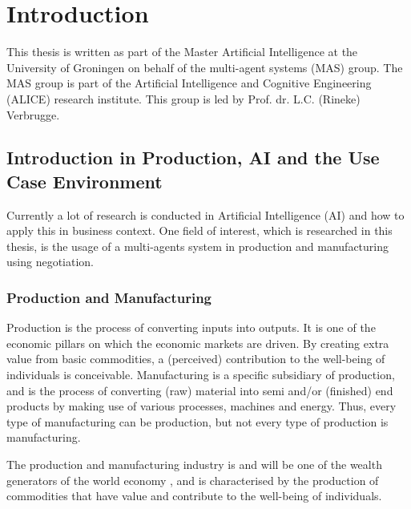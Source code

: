 \chapter{Introduction}
\label{ch:intro}
This thesis is written as part of the Master Artificial Intelligence at the University of Groningen on behalf of the multi-agent systems (MAS) group. The MAS group is part of the Artificial Intelligence and Cognitive Engineering (ALICE) research institute. This group is led by Prof. dr. L.C. (Rineke) Verbrugge.  
   
\section{Introduction in Production, AI and the Use Case Environment}

Currently a lot of research is conducted in Artificial Intelligence (AI) and how to apply this in business context. One field of interest, which is researched in this thesis, is the usage of a multi-agents system in production and manufacturing using negotiation.

\subsection{Production and Manufacturing}
Production is the process of converting inputs into outputs. It is one of the economic pillars on which the economic markets are driven. By creating extra value from basic commodities, a (perceived) contribution to the well-being of individuals is conceivable. Manufacturing is a specific subsidiary of production, and is the process of converting (raw) material into semi and/or (finished) end products by making use of various processes, machines and energy. Thus, every type of manufacturing can be production, but not every type of production is manufacturing. 

The production and manufacturing industry is and will be one of the wealth generators of the world economy \citep{monostori2006agent}, and is characterised by the production of commodities that have value and contribute to the well-being of individuals.

